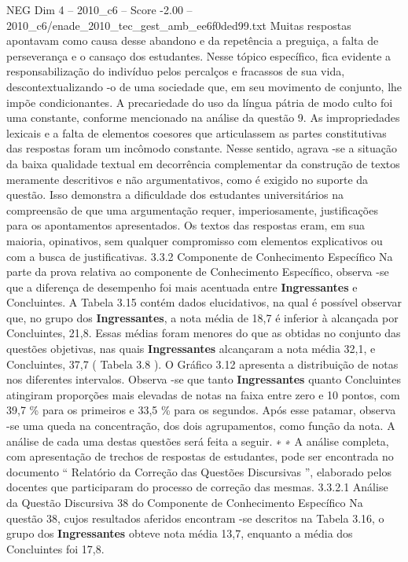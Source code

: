 \begin{textsample}{NEG Dim 4 – 2010\_c6 – Score -2.00 – 2010\_c6/enade\_2010\_tec\_gest\_amb\_ee6f0ded99.txt}
Muitas respostas apontavam como causa desse abandono e da repetência a preguiça, a falta de perseverança e o cansaço dos estudantes.
Nesse tópico específico, fica evidente a responsabilização do indivíduo pelos percalços e fracassos de sua vida, descontextualizando -o de uma sociedade que, em seu movimento de conjunto, lhe impõe condicionantes.
A precariedade do uso da língua pátria de modo culto foi uma constante, conforme mencionado na análise da questão 9.
As impropriedades lexicais e a falta de elementos coesores que articulassem as partes constitutivas das respostas foram um incômodo constante.
Nesse sentido, agrava -se a situação da baixa qualidade textual em decorrência complementar da construção de textos meramente descritivos e não argumentativos, como é exigido no suporte da questão.
Isso demonstra a dificuldade dos estudantes universitários na compreensão de que uma argumentação requer, imperiosamente, justificações para os apontamentos apresentados.
Os textos das respostas eram, em sua maioria, opinativos, sem qualquer compromisso com elementos explicativos ou com a busca de justificativas. 3.3.2 Componente de Conhecimento Específico Na parte da prova relativa ao componente de Conhecimento Específico, observa -se que a diferença de desempenho foi mais acentuada entre \textbf{Ingressantes} e Concluintes.
A Tabela 3.15 contém dados elucidativos, na qual é possível observar que, no grupo dos \textbf{Ingressantes}, a nota média de 18,7 é inferior à alcançada por Concluintes, 21,8.
Essas médias foram menores do que as obtidas no conjunto das questões objetivas, nas quais \textbf{Ingressantes} alcançaram a nota média 32,1, e Concluintes, 37,7 ( Tabela 3.8 ).
O Gráfico 3.12 apresenta a distribuição de notas nos diferentes intervalos.
Observa -se que tanto \textbf{Ingressantes} quanto Concluintes atingiram proporções mais elevadas de notas na faixa entre zero e 10 pontos, com 39,7 \% para os primeiros e 33,5 \% para os segundos.
Após esse patamar, observa -se uma queda na concentração, dos dois agrupamentos, como função da nota.
A análise de cada uma destas questões será feita a seguir. ∗ ∗ A análise completa, com apresentação de trechos de respostas de estudantes, pode ser encontrada no documento “ Relatório da Correção das Questões Discursivas ”, elaborado pelos docentes que participaram do processo de correção das mesmas. 3.3.2.1 Análise da Questão Discursiva 38 do Componente de Conhecimento Específico Na questão 38, cujos resultados aferidos encontram -se descritos na Tabela 3.16, o grupo dos \textbf{Ingressantes} obteve nota média 13,7, enquanto a média dos Concluintes foi 17,8.

\end{textsample}
